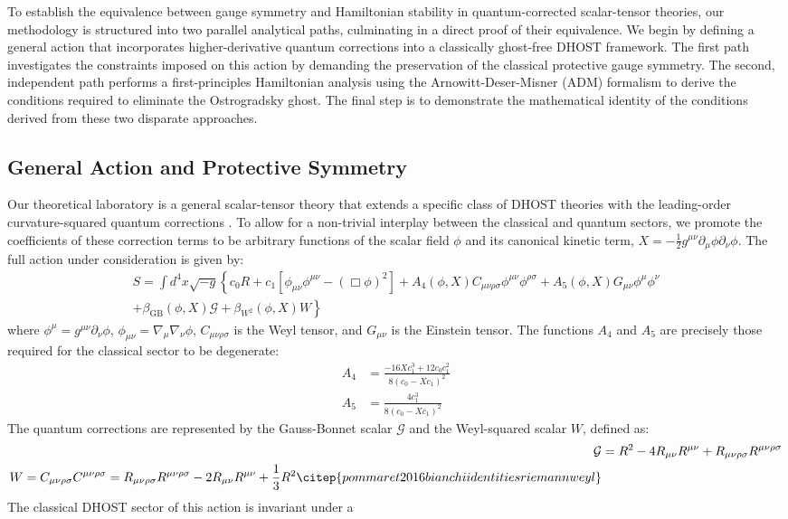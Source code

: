 \documentclass[twocolumn]{aastex631}
\begin{document}
To establish the equivalence between gauge symmetry and Hamiltonian stability in quantum-corrected scalar-tensor theories, our methodology is structured into two parallel analytical paths, culminating in a direct proof of their equivalence. We begin by defining a general action that incorporates higher-derivative quantum corrections into a classically ghost-free DHOST framework. The first path investigates the constraints imposed on this action by demanding the preservation of the classical protective gauge symmetry. The second, independent path performs a first-principles Hamiltonian analysis using the Arnowitt-Deser-Misner (ADM) formalism to derive the conditions required to eliminate the Ostrogradsky ghost. The final step is to demonstrate the mathematical identity of the conditions derived from these two disparate approaches.\subsection{General Action and Protective Symmetry}Our theoretical laboratory is a general scalar-tensor theory that extends a specific class of DHOST theories \citep{yousaf2024orthogonalsplittingdegeneratehigherorder} with the leading-order curvature-squared quantum corrections \citep{villegas2024quantumhighercurvaturecorrections}. To allow for a non-trivial interplay between the classical and quantum sectors, we promote the coefficients of these correction terms to be arbitrary functions of the scalar field $\phi$ and its canonical kinetic term, $X = -\frac{1}{2} g^{\mu\nu}\partial_\mu\phi\partial_\nu\phi$. The full action under consideration is given by:\begin{multline}S = \int d^4x \sqrt{-g} \left\{ c_0 R + c_1 \left[\phi_{\mu\nu}\phi^{\mu\nu} - (\Box\phi)^2\right] + A_4(\phi, X) C_{\mu\nu\rho\sigma} \phi^{\mu\nu}\phi^{\rho\sigma} + A_5(\phi, X) G_{\mu\nu}\phi^\mu\phi^\nu \right. \\\left. + \beta_{\text{GB}}(\phi, X) \mathcal{G} + \beta_{W^2}(\phi, X) W \right\}\end{multline}where $\phi^\mu = g^{\mu\nu}\partial_\nu\phi$, $\phi_{\mu\nu} = \nabla_\mu\nabla_\nu\phi$, $C_{\mu\nu\rho\sigma}$ is the Weyl tensor, and $G_{\mu\nu}$ is the Einstein tensor. The functions $A_4$ and $A_5$ are precisely those required for the classical sector to be degenerate:\begin{align}A_4 &= \frac{-16Xc_1^3 + 12c_0c_1^2}{8(c_0 - Xc_1)^2} \\A_5 &= \frac{4c_1^3}{8(c_0 - Xc_1)^2}\end{align}The quantum corrections are represented by the Gauss-Bonnet scalar $\mathcal{G}$ and the Weyl-squared scalar $W$, defined as: \citep{baykal2010unifiedapproachvariationalderivatives,rachwał2022understandstructurebetafunctions}\begin{align}\mathcal{G} &= R^2 - 4R_{\mu\nu}R^{\mu\nu} + R_{\mu\nu\rho\sigma}R^{\mu\nu\rho\sigma} \\W = C_{\mu\nu\rho\sigma}C^{\mu\nu\rho\sigma} = R_{\mu\nu\rho\sigma}R^{\mu\nu\rho\sigma} - 2R_{\mu\nu}R^{\mu\nu} + \frac{1}{3}R^2 \citep{pommaret2016bianchiidentitiesriemannweyl}\end{align}The classical DHOST sector of this action is invariant under a 
\end{document}
